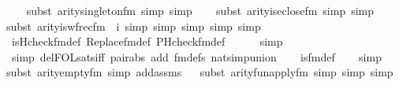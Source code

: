 \begin{isabellebody}
\ \ \ \isamarkupfalse%
{\isacharparenleft}{\kern0pt}subst\ arity{\isacharunderscore}{\kern0pt}singleton{\isacharunderscore}{\kern0pt}fm{\isacharcomma}{\kern0pt}\ simp{\isacharcomma}{\kern0pt}\ simp{\isacharparenright}{\kern0pt}\isanewline
\ \ \ \isamarkupfalse%
{\isacharparenleft}{\kern0pt}subst\ arity{\isacharunderscore}{\kern0pt}is{\isacharunderscore}{\kern0pt}eclose{\isacharunderscore}{\kern0pt}fm{\isacharcomma}{\kern0pt}\ simp{\isacharcomma}{\kern0pt}\ simp{\isacharparenright}{\kern0pt}\isanewline
\ \ \ \isamarkupfalse%
{\isacharparenleft}{\kern0pt}subst\ arity{\isacharunderscore}{\kern0pt}is{\isacharunderscore}{\kern0pt}wfrec{\isacharunderscore}{\kern0pt}fm\ {\isacharbrackleft}{\kern0pt}\ i{\isacharequal}{\kern0pt}{}{\isacharbrackright}{\kern0pt}{\isacharcomma}{\kern0pt}\ simp{\isacharcomma}{\kern0pt}\ simp{\isacharcomma}{\kern0pt}\ simp{\isacharcomma}{\kern0pt}\ simp{\isacharcomma}{\kern0pt}\ simp{\isacharparenright}{\kern0pt}\isanewline
\ \ \isamarkupfalse%
\ is{\isacharunderscore}{\kern0pt}Hcheck{\isacharunderscore}{\kern0pt}fm{\isacharunderscore}{\kern0pt}def\ Replace{\isacharunderscore}{\kern0pt}fm{\isacharunderscore}{\kern0pt}def\ PHcheck{\isacharunderscore}{\kern0pt}fm{\isacharunderscore}{\kern0pt}def\isanewline
\ \ \ \ \isamarkupfalse%
\ simp\isanewline
\ \ \ \isamarkupfalse%
\ {\isacharparenleft}{\kern0pt}simp\ del{\isacharcolon}{\kern0pt}FOL{\isacharunderscore}{\kern0pt}sats{\isacharunderscore}{\kern0pt}iff\ pair{\isacharunderscore}{\kern0pt}abs\ add{\isacharcolon}{\kern0pt}\ fm{\isacharunderscore}{\kern0pt}defs\ nat{\isacharunderscore}{\kern0pt}simp{\isacharunderscore}{\kern0pt}union{\isacharparenright}{\kern0pt}\isanewline
\ \ \isamarkupfalse%
\ is{\isacharunderscore}{\kern0pt}{}{\isacharunderscore}{\kern0pt}fm{\isacharunderscore}{\kern0pt}def\isanewline
\ \ \isamarkupfalse%
\ simp\isanewline
\ \ \isamarkupfalse%
{\isacharparenleft}{\kern0pt}subst\ arity{\isacharunderscore}{\kern0pt}empty{\isacharunderscore}{\kern0pt}fm{\isacharcomma}{\kern0pt}\ simp\ add{\isacharcolon}{\kern0pt}assms{\isacharparenright}{\kern0pt}\isanewline
\ \ \isamarkupfalse%
{\isacharparenleft}{\kern0pt}subst\ arity{\isacharunderscore}{\kern0pt}fun{\isacharunderscore}{\kern0pt}apply{\isacharunderscore}{\kern0pt}fm{\isacharcomma}{\kern0pt}\ simp{\isacharcomma}{\kern0pt}\ simp{\isacharcomma}{\kern0pt}\ simp{\isacharparenright}{\kern0pt}\isanewline

\end{isabellebody}
